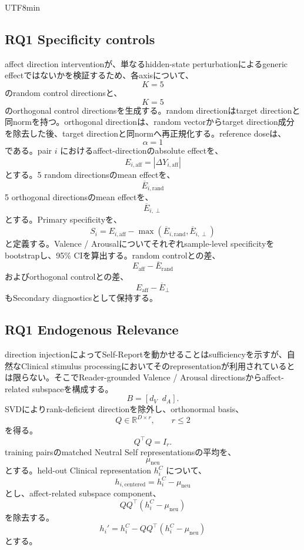 \documentclass{article} %
\begin{document}
\begin{CJK*}{UTF8}{min}
\subsection{RQ1 Specificity controls}

affect direction interventionが、単なるhidden-state perturbationによるgeneric effectではないかを検証するため、各axisについて、
\[
K=5
\]
のrandom control directionsと、
\[
K=5
\]
のorthogonal control directionsを生成する。random directionはtarget directionと同normを持つ。orthogonal directionは、random vectorからtarget direction成分を除去した後、target directionと同normへ再正規化する。reference doseは、
\[
\alpha=1
\]
である。pair \(i\) におけるaffect-directionのabsolute effectを、
\[
E_{i,\mathrm{aff}}
=
|
\Delta Y_{i,\mathrm{aff}}
|
\]
とする。5 random directionsのmean effectを、
\[
\overline{E}_{i,\mathrm{rand}}
\]
5 orthogonal directionsのmean effectを、
\[
\overline{E}_{i,\perp}
\]
とする。Primary specificityを、
\[
S_i
=
E_{i,\mathrm{aff}}
-
\max
(
\overline{E}_{i,\mathrm{rand}},
\overline{E}_{i,\perp}
)
\]
と定義する。Valence / Arousalについてそれぞれsample-level specificityをbootstrapし、95\% CIを算出する。random controlとの差、
\[
E_{\mathrm{aff}}-\overline{E}_{\mathrm{rand}}
\]
およびorthogonal controlとの差、
\[
E_{\mathrm{aff}}-\overline{E}_{\perp}
\]
もSecondary diagnosticsとして保持する。


\subsection{RQ1 Endogenous Relevance}

direction injectionによってSelf-Reportを動かせることはsufficiencyを示すが、自然なClinical stimulus processingにおいてそのrepresentationが利用されているとは限らない。そこでReader-grounded Valence / Arousal directionsからaffect-related subspaceを構成する。
\[
B
=
[
d_V\;\;d_A
].
\]
SVDによりrank-deficient directionを除外し、orthonormal basis、
\[
Q
\in
\mathbb{R}^{D\times r},
\qquad
r\le2
\]
を得る。
\[
Q^\top Q
=
I_r.
\]
training pairsのmatched Neutral Self representationsの平均を、
\[
\mu_{\mathrm{neu}}
\]
とする。held-out Clinical representation \(h_i^C\) について、
\[
h_{i,\mathrm{centered}}
=
h_i^C-\mu_{\mathrm{neu}}
\]
とし、affect-related subspace component、
\[
QQ^\top
(
h_i^C-\mu_{\mathrm{neu}}
)
\]
を除去する。
\[
h_i'
=
h_i^C
-
QQ^\top
(
h_i^C-\mu_{\mathrm{neu}}
)
\]
とする。



\end{CJK*}
\end{document}
